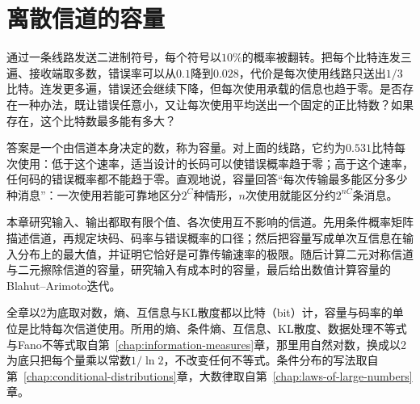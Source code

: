 \chapter{离散信道的容量}
\label{chap:discrete-channel-capacity}

通过一条线路发送二进制符号，每个符号以$10\%$的概率被翻转。把每个比特连发三遍、接收端取多数，错误率可以从$0.1$降到$0.028$，代价是每次使用线路只送出$1/3$比特。连发更多遍，错误还会继续下降，但每次使用承载的信息也趋于零。是否存在一种办法，既让错误任意小，又让每次使用平均送出一个固定的正比特数？如果存在，这个比特数最多能有多大？

答案是一个由信道本身决定的数，称为容量。对上面的线路，它约为$0.531$比特每次使用：低于这个速率，适当设计的长码可以使错误概率趋于零；高于这个速率，任何码的错误概率都不能趋于零。直观地说，容量回答“每次传输最多能区分多少种消息”：一次使用若能可靠地区分$2^{C}$种情形，$n$次使用就能区分约$2^{nC}$条消息。

本章研究输入、输出都取有限个值、各次使用互不影响的信道。先用条件概率矩阵描述信道，再规定块码、码率与错误概率的口径；然后把容量写成单次互信息在输入分布上的最大值，并证明它恰好是可靠传输速率的极限。随后计算二元对称信道与二元擦除信道的容量，研究输入有成本时的容量，最后给出数值计算容量的Blahut–Arimoto迭代。

全章以2为底取对数，熵、互信息与KL散度都以比特（bit）计，容量与码率的单位是比特每次信道使用。所用的熵、条件熵、互信息、KL散度、数据处理不等式与Fano不等式取自第~\ref{chap:information-measures}章，那里用自然对数，换成以2为底只把每个量乘以常数$1/\ln2$，不改变任何不等式。条件分布的写法取自第~\ref{chap:conditional-distributions}章，大数律取自第~\ref{chap:laws-of-large-numbers}章。
















